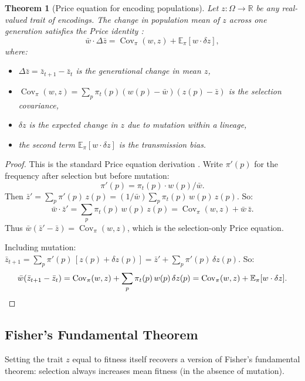\documentclass[12pt]{article}
\newtheorem{theorem}{Theorem}[section]
\newcommand{\wbar}{\bar{w}}
\newcommand{\E}{\mathbb{E}}
\newcommand{\Cov}{\operatorname{Cov}}
\newcommand{\R}{\mathbb{R}}
\begin{document}
\begin{theorem}[Price equation for encoding populations]\label{thm:price}
Let $z\colon \Omega \to \R$ be any real-valued trait of encodings. The change in population mean of $z$ across one generation satisfies the Price identity \citep{price_1970,price_1972}:
\begin{equation}\label{eq:price}
\wbar \cdot \Delta \bar{z} = \Cov_\pi(w, z) + \E_\pi[w \cdot \delta z],
\end{equation}
where:
\begin{itemize}
\item $\Delta \bar{z} = \bar{z}_{t+1} - \bar{z}_t$ is the generational change in mean $z$,
\item $\Cov_\pi(w, z) = \sum_p \pi_t(p)(w(p) - \wbar)(z(p) - \bar{z})$ is the selection covariance,
\item $\delta z$ is the expected change in $z$ due to mutation within a lineage,
\item the second term $\E_\pi[w \cdot \delta z]$ is the transmission bias.
\end{itemize}
\end{theorem}

\begin{proof}
This is the standard Price equation derivation \citep{price_1970,price_1972}. Write $\pi'(p)$ for the frequency after selection but before mutation:
\[
\pi'(p) = \pi_t(p) \cdot w(p)/\wbar.
\]
Then $\bar{z}' = \sum_p \pi'(p)\, z(p) = (1/\wbar) \sum_p \pi_t(p)\, w(p)\, z(p)$. So:
\[
\wbar \cdot \bar{z}' = \sum_p \pi_t(p)\, w(p)\, z(p) = \Cov_\pi(w, z) + \wbar\, \bar{z}.
\]
Thus $\wbar(\bar{z}' - \bar{z}) = \Cov_\pi(w, z)$, which is the selection-only Price equation.

Including mutation: $\bar{z}_{t+1} = \sum_p \pi'(p)\, [z(p) + \delta z(p)] = \bar{z}' + \sum_p \pi'(p)\, \delta z(p)$. So:
\[
\wbar(\bar{z}_{t+1} - \bar{z}_t) = \Cov_\pi(w, z) + \sum_p \pi_t(p)\, w(p)\, \delta z(p) = \Cov_\pi(w, z) + \E_\pi[w \cdot \delta z]. \qedhere
\]
\end{proof}

\subsection{Fisher's Fundamental Theorem}\label{sec:fisher}

Setting the trait $z$ equal to fitness itself recovers a version of Fisher's fundamental theorem: selection always increases mean fitness (in the absence of mutation).
\end{document}
